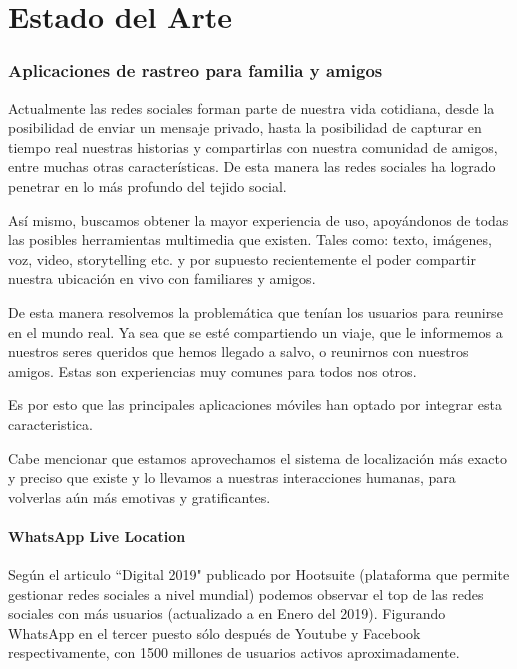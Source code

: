 \chapter{Estado del Arte}

\subsection{Aplicaciones de rastreo para familia y amigos}

Actualmente las redes sociales forman parte de nuestra vida cotidiana, desde la posibilidad de enviar un mensaje privado, hasta la posibilidad de capturar en tiempo real nuestras historias y compartirlas con nuestra comunidad de amigos, entre muchas otras características. De esta manera las redes sociales ha logrado penetrar en lo más profundo del tejido social.

Así mismo, buscamos obtener la mayor experiencia de uso, apoyándonos de todas las posibles herramientas multimedia que existen. Tales como: texto, imágenes, voz, video, storytelling etc. y por supuesto recientemente el poder compartir nuestra ubicación en vivo con familiares y amigos.

De esta manera resolvemos la problemática que tenían los usuarios para reunirse en el mundo real. Ya sea que se esté compartiendo un viaje, que le informemos a nuestros seres queridos que hemos llegado a salvo, o reunirnos con nuestros amigos. Estas son experiencias muy comunes para todos nos otros. \cite{zafirKhan}

Es por  esto que las principales aplicaciones móviles han optado por  integrar esta caracteristica. 

Cabe mencionar que estamos aprovechamos el sistema de localización más exacto y preciso que existe y lo llevamos a nuestras interacciones humanas, para volverlas aún más emotivas y gratificantes.

\subsubsection{WhatsApp Live Location}

Según el articulo ``Digital 2019" publicado por Hootsuite (plataforma que permite gestionar redes sociales a nivel mundial) podemos observar el top de las redes sociales con más usuarios (actualizado a  en Enero del 2019). Figurando WhatsApp en el tercer puesto sólo después de Youtube y Facebook respectivamente, con 1500 millones de usuarios activos aproximadamente.\cite{kemp}

